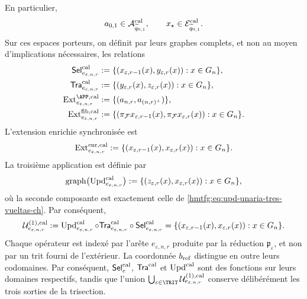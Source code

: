 En particulier,
\[
 a_{0,1}\in\mathcal A^{\rm cal}_{\widetilde q_{0,1}},
 \qquad
 x_\star\in\mathcal E^{\rm cal}_{\widetilde q_{0,1}}.
\]
Sur ces espaces porteurs, on définit par leurs graphes complets, et non au moyen d'implications nécessaires, les relations
\begin{align}
 \mathsf{Sel}^{\rm cal}_{e_{\varepsilon,n,r}}
   &:=\{(x_{\varepsilon,r-1}(x),y_{\varepsilon,r}(x)):
          x\in G_n\},\\
 \mathsf{Tra}^{\rm cal}_{e_{\varepsilon,n,r}}
   &:=\{(y_{\varepsilon,r}(x),z_{\varepsilon,r}(x)):
          x\in G_n\},\\
 \operatorname{Ext}^{\APP,\rm cal}_{e_{\varepsilon,n,r}}
   &:=\{(a_{n,r},a_{(n,r)^+})\},
 \label{hmtfg:eq:ext-app-calibrada-ch}\\
 \operatorname{Ext}^{\rm fib,cal}_{e_{\varepsilon,n,r}}
   &:=\{(\pi_{\mathcal F}x_{\varepsilon,r-1}(x),
          \pi_{\mathcal F}x_{\varepsilon,r}(x)):x\in G_n\}.
 \label{hmtfg:eq:ext-fibra-calibrada-ch}
\end{align}
L'extension enrichie synchronisée est
\begin{equation}
 \operatorname{Ext}^{\rm enr,cal}_{e_{\varepsilon,n,r}}
 :=\{(x_{\varepsilon,r-1}(x),x_{\varepsilon,r}(x)):
       x\in G_n\}.
 \label{hmtfg:eq:ext-enriquecida-calibrada-ch}
\end{equation}
La troisième application est définie par
\begin{equation}
 \operatorname{graph}
 \bigl(\operatorname{Upd}^{\rm cal}_{e_{\varepsilon,n,r}}\bigr)
 :=\{(z_{\varepsilon,r}(x),x_{\varepsilon,r}(x)):
       x\in G_n\},
 \label{hmtfg:eq:grafo-upd-calibrado-ch}
\end{equation}
où la seconde composante est exactement celle de
\eqref{hmtfg:eq:upd-unaria-tres-vueltas-ch}. Par conséquent,
\begin{equation}
 \mathcal U^{(1),\rm cal}_{e_{\varepsilon,n,r}}
 :=\operatorname{Upd}^{\rm cal}_{e_{\varepsilon,n,r}}\circ
   \mathsf{Tra}^{\rm cal}_{e_{\varepsilon,n,r}}\circ
   \mathsf{Sel}^{\rm cal}_{e_{\varepsilon,n,r}}
 =\{(x_{\varepsilon,r-1}(x),x_{\varepsilon,r}(x)):
      x\in G_n\}.
 \label{hmtfg:eq:transicion-cal-en-tpk-ch}
\end{equation}
Chaque opérateur est indexé par l’arête
\(e_{\varepsilon,n,r}\) produite par la réduction
\(\mathfrak p_\varepsilon\), et non par un trit fourni de l’extérieur. La
coordonnée \(b_{\rm ref}\) distingue en outre leurs codomaines. Par conséquent,
\(\mathsf{Sel}^{\rm cal}_{e}\),
\(\mathsf{Tra}^{\rm cal}\) et \(\operatorname{Upd}^{\rm cal}\) sont des fonctions
sur leurs domaines respectifs, tandis que
l’union
\(\bigcup_{\varepsilon\in\TRIT}
\mathcal U^{(1),\rm cal}_{e_{\varepsilon,n,r}}\) conserve délibérément
les trois sorties de la trisection.

